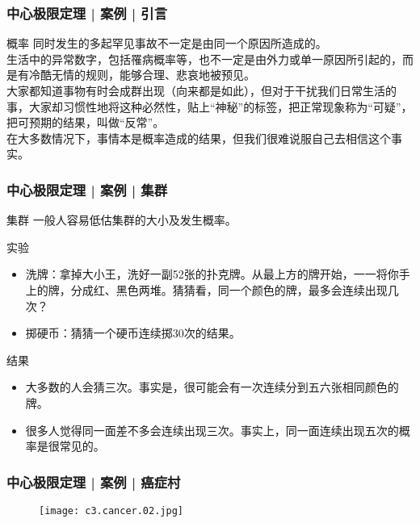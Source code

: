 \begin{frame}
  \frametitle{中心极限定理 | 案例 | 引言}
  \begin{block}{概率}
    同时发生的多起罕见事故不一定是由同一个原因所造成的。\\
    \vspace{0.5em}
    生活中的异常数字，包括罹病概率等，也不一定是由外力或单一原因所引起的，而是有冷酷无情的规则，能够合理、悲哀地被预见。\\
    \vspace{0.5em}
大家都知道事物有时会成群出现（向来都是如此），但对于干扰我们日常生活的事，大家却习惯性地将这种必然性，贴上“神秘”的标签，把正常现象称为“可疑”，把可预期的结果，叫做“反常”。\\
    \vspace{0.5em}
    在大多数情况下，事情本是概率造成的结果，但我们很难说服自己去相信这个事实。
  \end{block}
\end{frame}

\begin{frame}
  \frametitle{中心极限定理 | 案例 | 集群}
  \begin{block}{集群}
    一般人容易低估集群的大小及发生概率。
  \end{block}
  \pause
  \begin{block}{实验}
    \begin{itemize}
      \item 洗牌：拿掉大小王，洗好一副52张的扑克牌。从最上方的牌开始，一一将你手上的牌，分成红、黑色两堆。猜猜看，同一个颜色的牌，最多会连续出现几次？
      \item 掷硬币：猜猜一个硬币连续掷30次的结果。
    \end{itemize}
  \end{block}
  \pause
  \begin{block}{结果}
    \begin{itemize}
      \item 大多数的人会猜三次。事实是，很可能会有一次连续分到五六张相同颜色的牌。
      \item 很多人觉得同一面差不多会连续出现三次。事实上，同一面连续出现五次的概率是很常见的。
    \end{itemize}
  \end{block}
\end{frame}

\begin{frame}
  \frametitle{中心极限定理 | 案例 | 癌症村}
  \begin{figure}
    \centering
    \texttt{[image: c3.cancer.02.jpg]}
  \end{figure}
\end{frame}


